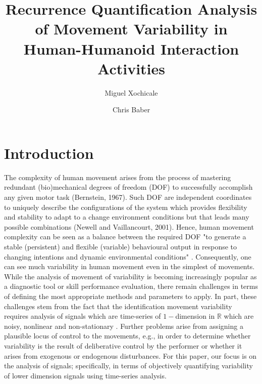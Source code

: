 \documentclass[fleqn,10pt]{wlscirep}
\title{Recurrence Quantification Analysis of Movement Variability in Human-Humanoid Interaction Activities}
\author[1,*]{Miguel Xochicale}
\author{Chris Baber}
\affil[1]{University of Birmingham,
	School of Computer Science,
	Birmingham, 
	B15 2TT, 
	UK}
\affil[*]{perez.xochicale@gmail.com}
\begin{document}
\flushbottom
\maketitle
\thispagestyle{empty}

\section*{Introduction}
The complexity of human movement arises from the process of mastering redundant (bio)mechanical degrees of freedom (DOF) to successfully accomplish any given motor task (Bernstein, 1967).
Such DOF are independent coordinates to uniquely describe the configurations of the system which provides flexibility and stability to adapt to a change environment conditions but that leads many possible combinations (Newell and Vaillancourt, 2001).
Hence, human movement complexity can be seen as a balance between the required DOF "to generate a stable (persistent) and flexible (variable) behavioural output in response to changing intentions and dynamic environmental conditions" \cite{davids2003}.
Consequently, one can see much variability in human movement even in the simplest of movements.
While the analysis of movement of variability is becoming increasingly popular as a diagnostic tool or skill performance evaluation, there remain challenges in terms of defining the most appropriate methods and parameters to apply.
In part, these challenges stem from the fact that the identification movement variability requires analysis of signals which are time-series of $1-$dimension in $\mathbb{R}$ which are noisy, nonlinear and non-stationary \cite{gomezgarcia2014}.
Further problems arise from assigning a plausible locus of control to the movements, e.g., in order to determine whether variability is the result of deliberative control by the performer or whether it arises from exogenous or endogenous disturbances.
For this paper, our focus is on the analysis of signals; specifically, in terms of objectively quantifying variability of lower dimension signals using time-series analysis.
\end{document}
